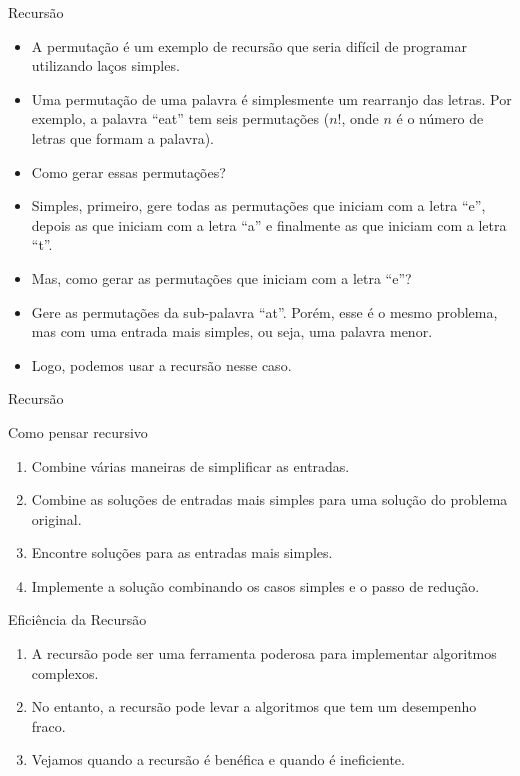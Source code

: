 \begin{frame}[fragile]{Recursão}
\begin{itemize}
	\item A permutação é um exemplo de recursão que seria difícil de programar utilizando laços simples.
	\item Uma permutação de uma palavra é simplesmente um rearranjo das letras. Por exemplo, a palavra ``eat'' tem seis permutações ($n!$, onde $n$ é o número de letras que formam a palavra).
	\item Como gerar essas permutações?
	\item Simples, primeiro, gere todas as permutações que iniciam com a letra ``e'', depois as que iniciam com a letra ``a'' e finalmente as que iniciam com a letra ``t''.
	\item Mas, como gerar as permutações que iniciam com a letra ``e''?
	\item Gere as permutações da sub-palavra ``at''. Porém, esse é o mesmo problema, mas com uma entrada mais simples, ou seja, uma palavra menor.
	\item Logo, podemos usar a recursão nesse caso.
\end{itemize}
\end{frame}


\begin{frame}[fragile]{Recursão}
\begin{block}{Como pensar recursivo}  
		\begin{enumerate}
			\item Combine várias maneiras de simplificar as entradas.
			\item Combine as soluções de entradas mais simples para uma solução do problema original.
			\item Encontre soluções para as entradas mais simples.
			\item Implemente a solução combinando os casos simples e o passo de redução.
		\end{enumerate}
\end{block}
\end{frame}

\begin{frame}[fragile]{Eficiência da Recursão}
\begin{enumerate}
	\item A recursão pode ser uma ferramenta poderosa para implementar algoritmos complexos.
	\item No entanto, a recursão pode levar a algoritmos que tem um desempenho fraco.
	\item Vejamos quando a recursão é benéfica e quando é ineficiente.	
\end{enumerate}
\end{frame}

